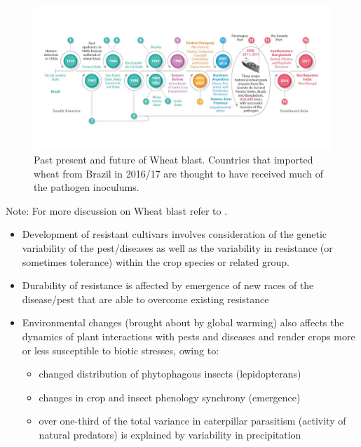 \documentclass[11pt,dvipsnames,ignorenonframetext,aspectratio=169]{beamer}
\providecommand{\tightlist}{%
  \setlength{\itemsep}{0pt}\setlength{\parskip}{0pt}}
\begin{document}
\begin{frame}{}
\protect\hypertarget{section-2}{}
\begin{figure}
\includegraphics[width=0.86\linewidth]{../images/wheat_blast_distribution_due_brazil} \caption{Past present and future of Wheat blast. Countries that imported wheat from Brazil in 2016/17 are thought to have received much of the pathogen inoculums.}\label{fig:wheat-blast}
\end{figure}

\footnotesize Note: For more discussion on Wheat blast refer to
\citet{ceresini2018wheat}.
\end{frame}

\begin{frame}{}
\protect\hypertarget{section-3}{}
\begin{itemize}
\tightlist
\item
  Development of resistant cultivars involves consideration of the
  genetic variability of the pest/diseases as well as the variability in
  resistance (or sometimes tolerance) within the crop species or related
  group.
\item
  Durability of resistance is affected by emergence of new races of the
  disease/pest that are able to overcome existing resistance
\item
  Environmental changes (brought about by global warming) also affects
  the dynamics of plant interactions with pests and diseases and render
  crops more or less susceptible to biotic stresses, owing to:

  \begin{itemize}
  \tightlist
  \item
    changed distribution of phytophagous insects (lepidopterans)
  \item
    changes in crop and insect phenology synchrony (emergence)
  \item
    over one-third of the total variance in caterpillar parasitism
    (activity of natural predators) is explained by variability in
    precipitation
  \end{itemize}
\end{itemize}
\end{frame}
\end{document}
